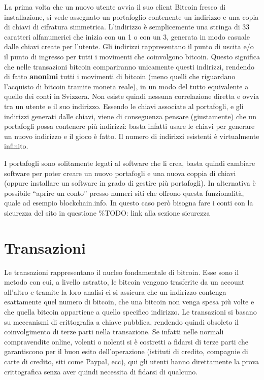 La prima volta che un nuovo utente avvia il suo client Bitcoin fresco di
installazione, si vede assegnato un portafoglio contenente un indirizzo
e una copia di chiavi di cifratura simmetrica. L'indirizzo è
semplicemente una stringa di 33 caratteri alfanumerici che inizia con un
1 o con un 3, generata in modo casuale dalle chiavi create per l'utente.
Gli indirizzi rappresentano il punto di uscita e/o il punto di ingresso
per tutti i movimenti che coinvolgono bitcoin. Questo significa che
nelle transazioni bitcoin compariranno unicamente questi indirizzi,
rendendo di fatto \textbf{anonimi} tutti i movimenti di bitcoin (meno
quelli che riguardano l'acquisto di bitcoin tramite moneta reale), in un
modo del tutto equivalente a quello dei conti in Svizzera. Non esiste
quindi nessuna correlazione diretta e ovvia tra un utente e il suo
indirizzo. Essendo le chiavi associate al portafogli, e gli indirizzi
generati dalle chiavi, viene di conseguenza pensare (giustamente) che un
portafogli possa contenere più indirizzi: basta infatti usare le chiavi
per generare un nuovo indirizzo e il gioco è fatto. Il numero di
indirizzi esistenti è virtualmente infinito.

I portafogli sono solitamente legati al software che li crea, basta
quindi cambiare software per poter creare un nuovo portafogli e una
nuova coppia di chiavi (oppure installare un software in grado di
gestire più portafogli). In alternativa è possibile ``aprire un conto''
presso numeri siti che offrono questa funzionalità, quale ad esempio
blockchain.info. In questo caso però bisogna fare i conti con la
sicurezza del sito in questione \%TODO: link alla sezione sicurezza

\section{Transazioni}\label{transazioni}

Le transazioni rappresentano il nucleo fondamentale di bitcoin. Esse
sono il metodo con cui, a livello astratto, le bitcoin vengono
trasferite da un account all'altro e tramite la loro analisi ci si
assicura che un indirizzo contenga esattamente quel numero di bitcoin,
che una bitcoin non venga spesa più volte e che quella bitcoin
appartiene a quello specifico indirizzo. Le transazioni si basano su
meccanismi di crittografia a chiave pubblica, rendendo quindi obsoleto
il coinvolgimento di terze parti nella transazione. Se infatti nelle
normali compravendite online, volenti o nolenti si è costretti a fidarsi
di terze parti che garantiscono per il buon esito dell'operazione
(istituti di credito, compagnie di carte di credito, siti come Paypal,
ecc), qui gli utenti hanno direttamente la prova crittografica senza
aver quindi necessita di fidarsi di qualcuno.


